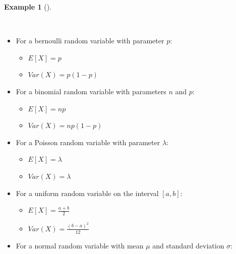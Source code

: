 \documentclass[
  letterpaper,
  DIV=11,
  numbers=noendperiod]{scrreport}
\providecommand{\tightlist}{%
  \setlength{\itemsep}{0pt}\setlength{\parskip}{0pt}}
\theoremstyle{definition}
\newtheorem{example}{Example}[chapter]
\theoremstyle{plain}
\theoremstyle{definition}
\theoremstyle{plain}
\theoremstyle{remark}
\begin{document}
\begin{tcolorbox}[enhanced jigsaw, breakable, opacityback=0, leftrule=.75mm, colback=white, bottomtitle=1mm, coltitle=black, toptitle=1mm, titlerule=0mm, bottomrule=.15mm, colframe=quarto-callout-note-color-frame, title={Examples of Expectation and Variance}, opacitybacktitle=0.6, colbacktitle=quarto-callout-note-color!10!white, rightrule=.15mm, arc=.35mm, toprule=.15mm, left=2mm]

\begin{example}[]\protect\hypertarget{exm-expectation-variance}{}\label{exm-expectation-variance}

~

\begin{itemize}
\tightlist
\item
  For a bernoulli random variable with parameter \(p\):

  \begin{itemize}
  \tightlist
  \item
    \(E[X] = p\)
  \item
    \(Var(X) = p(1 - p)\)
  \end{itemize}
\item
  For a binomial random variable with parameters \(n\) and \(p\):

  \begin{itemize}
  \tightlist
  \item
    \(E[X] = np\)
  \item
    \(Var(X) = np(1 - p)\)
  \end{itemize}
\item
  For a Poisson random variable with parameter \(\lambda\):

  \begin{itemize}
  \tightlist
  \item
    \(E[X] = \lambda\)
  \item
    \(Var(X) = \lambda\)
  \end{itemize}
\item
  For a uniform random variable on the interval \([a, b]\):

  \begin{itemize}
  \tightlist
  \item
    \(E[X] = \frac{a + b}{2}\)
  \item
    \(Var(X) = \frac{(b - a)^2}{12}\)
  \end{itemize}
\item
  For a normal random variable with mean \(\mu\) and standard deviation
  \(\sigma\):


\end{itemize}
\end{example}
\end{tcolorbox}
\end{document}
